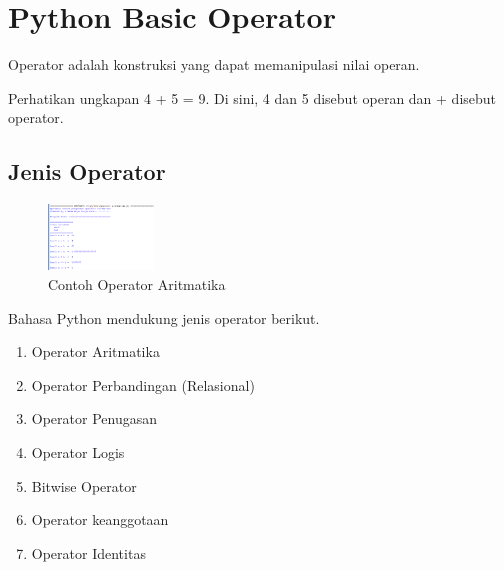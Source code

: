 \sloppy
\section{Python Basic Operator}


\vspace{12pt}
\noindent
Operator adalah konstruksi yang dapat memanipulasi nilai operan. \par
\vspace{12pt}
\noindent
Perhatikan ungkapan 4 + 5 = 9. Di sini, 4 dan 5 disebut operan dan + disebut operator. \par
\vspace{12pt}
\noindent

\subsection{Jenis Operator}

\begin{figure}[ht]
 	\centerline{\includegraphics[width=0.25\textwidth]{figures/ctharitmatika}}
 	\caption{Contoh Operator Aritmatika}
 	\label{contoh}
\end{figure}

\vspace{12pt}
\noindent
Bahasa Python mendukung jenis operator berikut. \par
\vspace{12pt}
\noindent
\begin{enumerate}
	\item Operator Aritmatika
	\item Operator Perbandingan (Relasional)
	\item Operator Penugasan \par
	\item Operator Logis \par
	\item Bitwise Operator \par
	\item Operator keanggotaan \par
	\item Operator Identitas \par
\end{enumerate}


